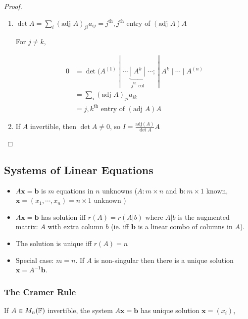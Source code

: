 \documentclass[a4paper]{article}
\begin{document}
\begin{proof}
	\begin{enumerate}
		\item $ \det A = \sum_{i}(\text{adj }A)_{ji}a_{ij} =  j^{\text{th}},j^{\text{th}}$ entry of $ (\text{adj }A)A $
		
		For $ j \neq k $, 
		
		\begin{align*}
		0 & = \det( A^{(1)} \; | \; \cdots \; \underbrace{| \; A^{k} \; |}_{j^{\text{th}} \text{ col}} \; \cdots ;\ | \; A^{k} \; | \; \cdots \; | \; A^{(n)}  \\
		& = \sum_{i} (\text{adj }A)_{ji} a_{ik} \\
		& = j,k^{\text{th}} \text{ entry of } (\text{adj }A)A
		\end{align*}
		\item If $ A $ invertible, then $\det A \neq 0  $, so $ I = \frac{\text{adj}(A)}{\det A} A $ 
	\end{enumerate}
\end{proof}

\subsection{Systems of Linear Equations}

\begin{itemize}
	\item $ A \mathbf{x} = \mathbf{b} $ is $ m $ equations in $ n $ unknowns ($ A: m \times n $ and $ \mathbf{b} : m \times 1 $ known, $ \mathbf{x} = (x_{1},\cdots,x_{n}) = n \times 1$ unknown  )
	
	\item $ A \mathbf{x} = \mathbf{b} $ has solution iff $ r(A) = r(A | b) $ where $ A | b $ is the augmented matrix: $ A  $ with extra column $ b $ (ie. iff $ \mathbf{b} $ is a linear combo of columns in $ A $).
	
	\item The solution is unique iff $ r(A) = n $
	
	\item Special case: $ m = n $. If $ A $ is non-singular then there is a unique solution $ \mathbf{x} = A^{-1} \mathbf{b} $.
\end{itemize}

\subsubsection{The Cramer Rule}


If $ A \in M_{n} (\mathbb{F}) $ invertible, the system $ A \mathbf{x} = \mathbf{b} $ has unique solution $ \mathbf{x} =  (x_{i}) $, 
\end{document}

